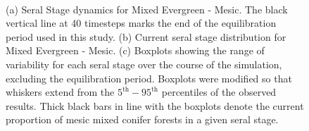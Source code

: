 \begin{figure}[!htbp]
  \centering
  \\
  \caption{(a) Seral Stage dynamics for Mixed Evergreen - Mesic. The black vertical line at 40 timesteps marks the end of the equilibration period used in this study. (b) Current seral stage distribution for Mixed Evergreen - Mesic. (c) Boxplots showing the range of variability for each seral stage over the course of the simulation, excluding the equilibration period. Boxplots were modified so that whiskers extend from the $5^{\text{th}} - 95^{\text{th}}$ percentiles of the observed results. Thick black bars in line with the boxplots denote the current proportion of mesic mixed conifer forests in a given seral stage.}
\label{fig:covcond_megm}
\end{figure}

